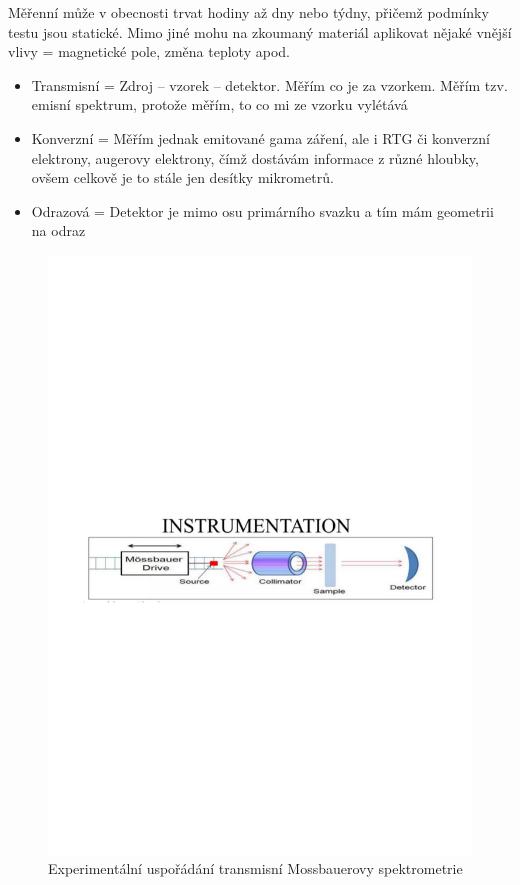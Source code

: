 Měřenní může v obecnosti trvat hodiny až dny nebo týdny, přičemž podmínky testu jsou statické. Mimo jiné mohu na zkoumaný materiál aplikovat nějaké vnější vlivy = magnetické pole, změna teploty apod.

\begin{itemize}
    \item Transmisní = Zdroj -- vzorek -- detektor. Měřím co je za vzorkem. Měřím tzv. emisní spektrum, protože měřím, to co mi ze vzorku vylétává

    \item Konverzní = Měřím jednak emitované gama záření, ale i RTG či konverzní elektrony, augerovy elektrony, čímž dostávám informace z různé hloubky, ovšem celkově je to stále jen desítky mikrometrů.

    \item Odrazová = Detektor je mimo osu primárního svazku a tím mám geometrii na odraz
\end{itemize}


\begin{figure}[H]
    \centering
    \includegraphics[width=0.8\linewidth, trim={1.5cm 11cm 1.5cm 11cm}, clip]{img/mossbauer_instrumentation.pdf}
    \caption{Experimentální uspořádání transmisní Mossbauerovy spektrometrie}
    \label{fig:2_6_mossbauer_zapojeni}
\end{figure}

